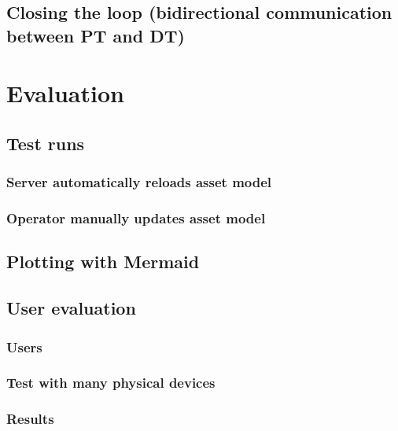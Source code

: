 \documentclass{article}
\begin{document}
\subsection{Closing the loop (bidirectional communication between PT and DT)}




\newpage
\section{Evaluation}\label{sec:Evaluation}
\subsection{Test runs}

\subsubsection{Server automatically reloads asset model}
\subsubsection{Operator manually updates asset model}
\subsection{Plotting with Mermaid}
\subsection{User evaluation}
\subsubsection{Users}
\subsubsection{Test with many physical devices}
\subsubsection{Results}




\newpage
\end{document}
